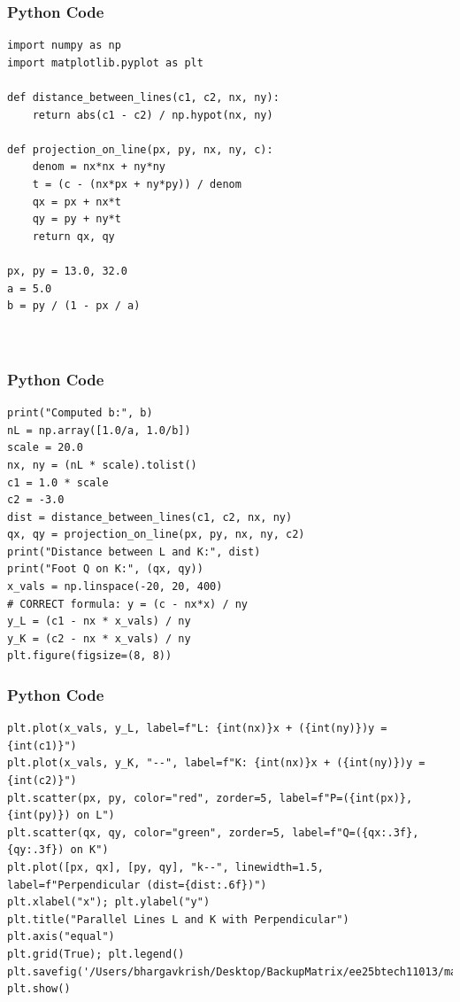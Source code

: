\documentclass{beamer}
\begin{document}
\begin{frame}[fragile]
    \frametitle{Python Code}
    \begin{lstlisting}
import numpy as np
import matplotlib.pyplot as plt

def distance_between_lines(c1, c2, nx, ny):
    return abs(c1 - c2) / np.hypot(nx, ny)

def projection_on_line(px, py, nx, ny, c):
    denom = nx*nx + ny*ny
    t = (c - (nx*px + ny*py)) / denom
    qx = px + nx*t
    qy = py + ny*t
    return qx, qy

px, py = 13.0, 32.0   
a = 5.0              
b = py / (1 - px / a)



    \end{lstlisting}
\end{frame}

\begin{frame}[fragile]
    \frametitle{Python Code}
    \begin{lstlisting}
print("Computed b:", b) 
nL = np.array([1.0/a, 1.0/b])
scale = 20.0
nx, ny = (nL * scale).tolist()   
c1 = 1.0 * scale              
c2 = -3.0
dist = distance_between_lines(c1, c2, nx, ny)
qx, qy = projection_on_line(px, py, nx, ny, c2)
print("Distance between L and K:", dist)
print("Foot Q on K:", (qx, qy))
x_vals = np.linspace(-20, 20, 400)
# CORRECT formula: y = (c - nx*x) / ny
y_L = (c1 - nx * x_vals) / ny
y_K = (c2 - nx * x_vals) / ny
plt.figure(figsize=(8, 8))

    \end{lstlisting}
\end{frame}

\begin{frame}[fragile]
    \frametitle{Python Code}
    \begin{lstlisting}
plt.plot(x_vals, y_L, label=f"L: {int(nx)}x + ({int(ny)})y = {int(c1)}")
plt.plot(x_vals, y_K, "--", label=f"K: {int(nx)}x + ({int(ny)})y = {int(c2)}")
plt.scatter(px, py, color="red", zorder=5, label=f"P=({int(px)},{int(py)}) on L")
plt.scatter(qx, qy, color="green", zorder=5, label=f"Q=({qx:.3f},{qy:.3f}) on K")
plt.plot([px, qx], [py, qy], "k--", linewidth=1.5, label=f"Perpendicular (dist={dist:.6f})")
plt.xlabel("x"); plt.ylabel("y")
plt.title("Parallel Lines L and K with Perpendicular")
plt.axis("equal")
plt.grid(True); plt.legend()
plt.savefig('/Users/bhargavkrish/Desktop/BackupMatrix/ee25btech11013/matgeo/4.13.18/figs/Figure_1.png')
plt.show()

    \end{lstlisting}
\end{frame}
\end{document}
